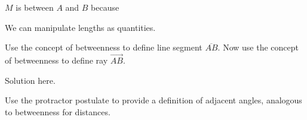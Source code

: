 \documentclass[nooutcomes]{ximera}
\begin{document}
$M$ is between $A$ and $B$ because 

We can manipulate lengths as quantities.  


\begin{question}
Use the concept of betweenness to define line segment $\overline{AB}$.  Now use the concept of betweenness to 
define ray $\overrightarrow{AB}$. 

\begin{solution}
Solution here. 
\end{solution}
\end{question}

\begin{question}
Use the protractor postulate to provide a definition of adjacent angles, analogous to betweenness for distances.  
\end{question}
\end{document}
